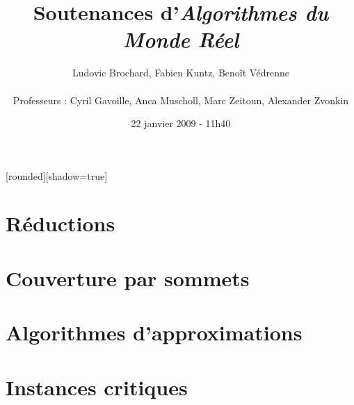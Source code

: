 \documentclass[8pt]{beamer}
\begin{document}

[rounded][shadow=true]

\author[Ludovic Brochard, Fabien Kuntz, Benoît Védrenne]{Ludovic
Brochard, Fabien Kuntz, Benoît Védrenne\\ 
~\\
\small Professeurs : Cyril Gavoille, Anca Muscholl, Marc Zeitoun,
Alexander Zvonkin}
\title{Soutenances d'\textit{Algorithmes du Monde Réel}} 
\date{22 janvier 2009 - 11h40}

\setcounter{page}{1}

\frame{\titlepage}
\frame{\tableofcontents}

 \section{Réductions}
 \frame{\tableofcontents[current]}
 

 \section{Couverture par sommets}
 \frame{\tableofcontents[current]}
  

 \section{Algorithmes d'approximations}
 \frame{\tableofcontents[current]}
  
  
 \section{Instances critiques}
 \frame{\tableofcontents[current]}
  
\end{document}
